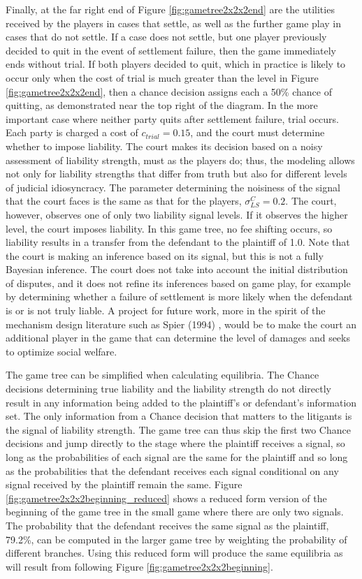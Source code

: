 \documentclass{article}
\begin{document}
Finally, at the far right end of Figure \ref{fig:gametree2x2x2end} are the utilities received by the players in cases that settle, as well as the further game play in cases that do not settle. If a case does not settle, but one player previously decided to quit in the event of settlement failure, then the game immediately ends without trial. If both players decided to quit, which in practice is likely to occur only when the cost of trial is much greater than the level in Figure \ref{fig:gametree2x2x2end}, then a chance decision assigns each a 50\% chance of quitting, as demonstrated near the top right of the diagram. In the more important case where neither party quits after settlement failure, trial occurs. Each party is charged a cost of $c_{trial}=0.15$, and  the court must determine whether to impose liability. The court makes its decision based on a noisy assessment of liability strength, must as the players do; thus, the modeling allows not only for liability strengths that differ from truth but also for different levels of judicial idiosyncracy. The parameter determining the noisiness of the signal that the court faces is the same as that for the players, $\sigma_{LS}^C=0.2$. The court, however, observes one of only two liability signal levels. If it observes the higher level, the court imposes liability. In this game tree, no fee shifting occurs, so liability results in a transfer from the defendant to the plaintiff of 1.0.  Note that the court is making an inference based on its signal, but this is not a fully Bayesian inference. The court does not take into account the initial distribution of disputes, and it does not refine its inferences based on game play, for example by determining whether a failure of settlement is more likely when the defendant is or is not truly liable. A project for future work, more in the spirit of the mechanism design literature such as Spier (1994) \cite{spier}, would be to make the court an additional player in the game that can determine the level of damages and seeks to optimize social welfare.

The game tree can be simplified when calculating equilibria. The Chance decisions determining true liability and the liability strength do not directly result in any information being added to the plaintiff's or defendant's information set. The only information from a Chance decision that matters to the litigants is the signal of liability strength. The game tree can thus skip the first two Chance decisions and jump directly to the stage where the plaintiff receives a signal, so long as the probabilities of each signal are the same for the plaintiff and so long as the probabilities that the defendant receives each signal conditional on any signal received by the plaintiff remain the same. Figure \ref{fig:gametree2x2x2beginning_reduced} shows a reduced form version of the beginning of the game tree in the small game where there are only two signals. The probability that the defendant receives the same signal as the plaintiff, 79.2\%, can be computed in the larger game tree by weighting the probability of different branches. Using this reduced form will produce the same equilibria as will result from following Figure \ref{fig:gametree2x2x2beginning}. 
\end{document}
